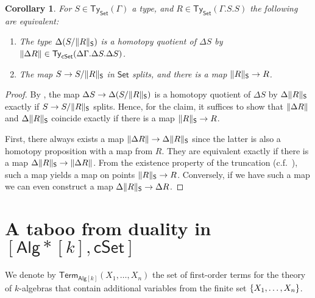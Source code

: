 \documentclass[10pt,a4paper]{article}
\newtheorem{corollary}[theorem]{Corollary}
\theoremstyle{definition}
\theoremstyle{remark}
\newcommand{\Set}{\mathsf{Set}}
\newcommand{\cSet}{\mathsf{cSet}}
\newcommand{\Alg}{\mathsf{Alg}}
\newcommand\Ty{\mathsf{Ty}}
\DeclarePairedDelimiter\set{\{}{\}}
\newcommand\Term{\mathsf{Term}}
\begin{document}
\begin{corollary}\label{prop:set-relevant-quotient-is-homotopy-quotient-iff-surjection-splits-and-witnesses-exist}
  For \(S \in \Ty_{\Set}(\Gamma)\) a type, and \(R \in \Ty_{\Set}(\Gamma.S.S)\) the following are equivalent:
  \begin{enumerate}[label=(\arabic*)]
    \item The type \(\Delta(S/\trunc*{R})\) is a homotopy quotient of \(\Delta S\) by \(\trunc{\Delta R} \in \Ty_{\cSet}(\Delta\Gamma.\Delta S. \Delta S)\).
    \item The map \(S \to S/\trunc*{R}\) in \(\Set\) splits, and there is a map \(\trunc*{R} \to R\).
  \end{enumerate}
\end{corollary}
\begin{proof}
  By , the map \(\Delta S \to \Delta(S/\trunc*{R})\) is a homotopy quotient of \(\Delta S\) by \(\Delta\trunc*{R}\) exactly if \(S \to S/\trunc*{R}\) splits.
  Hence, for the claim, it suffices to show that \(\trunc{\Delta R}\) and \(\Delta\trunc*{R}\) coincide exactly if there is a map \(\trunc*{R} \to R\).
  
  First, there always exists a map \(\trunc{\Delta R} \to \Delta\trunc*{R}\) since the latter is also a homotopy proposition with a map from \(R\).
  They are equivalent exactly if there is a map \(\Delta\trunc*{R} \to \trunc{\Delta R}\).
  From the existence property of the truncation (c.f.~\cite[Section~8.3]{draft}), such a map yields a map on points \(\trunc*{R} \to R\).
  Conversely, if we have such a map we can even construct a map \(\Delta\trunc*{R} \to \Delta R\).
\end{proof}


\section{A taboo from duality in \texorpdfstring{\([\Alg*[k], \cSet]\)}{[k-Algᶠᵖ, cSet]}}\label{sec:k-duality-implies-k-alg-choice}

We denote by \(\Term_{\Alg[k]}(X_1, \ldots, X_n)\) the set of first-order terms for the theory of \(k\)-algebras that contain additional variables from the finite set \(\set{X_1, \ldots, X_n}\).
\end{document}
